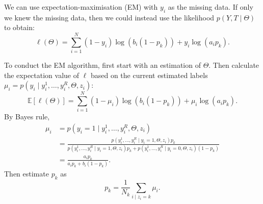 \documentclass[a4paper]{article}
\begin{document}
    We can use expectation-maximisation (EM) with $y_i$ as the missing data. If only we knew the missing data, then we could instead use the likelihood $p(Y, T \mid \Theta)$ to obtain:
    \begin{equation}
        \ell(\Theta) = \sum_{i = 1}^N (1 - y_i) \log \left(b_i (1 - p_k)\right) + y_i \log \left(a_i p_k\right).
    \end{equation}

    To conduct the EM algorithm, first start with an estimation of $\Theta$. Then calculate the expectation value of $\ell$ based on the current estimated labels $\mu_i = p(y_i \mid y_i^1, \dots, y_i^R, \Theta, z_i)$:
    \begin{equation}
        \mathbb E[\ell(\Theta)] = \sum_{i = 1}^N (1 - \mu_i) \log \left(b_i (1 - p_k)\right) + \mu_i \log \left(a_i p_k\right).
    \end{equation}
    By Bayes rule,
    \begin{align}
        \mu_i &= p(y_i = 1\mid y_i^1, \dots, y_i^R, \Theta, z_i)\\
         &= \frac{p(y_i^1, \dots, y_i^R \mid y_i = 1, \Theta, z_i) p_k}{p(y_i^1, \dots, y_i^R \mid y_i = 1, \Theta, z_i) p_k + p(y_i^1, \dots, y_i^R \mid y_i = 0, \Theta, z_i) (1 - p_k)}\\
         &= \frac{a_i p_k}{a_i p_k + b_i (1 - p_k)}.
    \end{align}
    Then estimate $p_k$ as
    \begin{equation}
        p_k = \frac{1}{N_k} \sum_{i \mid z_i = k} \mu_i.
    \end{equation}
\end{document}
